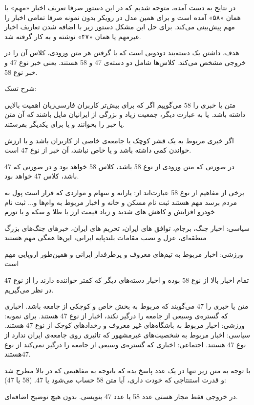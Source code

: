 در نتایج به دست آمده، متوجه شدیم که در این دستور صرفا تعریف اخبار «مهم» یا همان «۵۸» آمده است و برای همین مدل در رویکر بدون نمونه صرفا تمامی اخبار را مهم پیش‌بینی می‌کند. برای حل این مشکل دستور زیر با اضافه شدن تعاریف اخبار غیرمهم یا همان «۴۷» نوشته و به کار گرفته شد.

\vspace{5pt}
\begin{scriptsize}
\begin{itshape}
    هدف، داشتن یک دسته‌بند دودویی است که با گرفتن هر متن ورودی، کلاس آن را در خروجی مشخص می‌کند. کلاس‌ها شامل دو دسته‌ی 47 و 58 هستند. یعنی خبر نوع 47 و خبر نوع 58.

    شرح تسک:
    
    متن یا خبری را 58 می‌گوییم اگر که برای بیش‌تر کاربران فارسی‌زبان اهمیت بالایی داشته باشد. یا به عبارت دیگر، جمعیت زیاد و بزرگی از ایرانیان مایل باشند که آن متن یا خبر را بخوانند و یا برای یکدیگر بفرستند.
    
     اگر خبری مربوط به یک قشر کوچک یا جامعه‌ی خاصی از کاربران باشد و یا ارزش خواندن کمی داشته باشد و یا خاص نباشد، آن خبر از نوع 47 است.
    
    در صورتی که متن ورودی از نوع 58 باشد، کلاس 58 خواهد بود و در صورتی که 47 باشد، کلاس 47 خواهد بود.
    
    برخی از مفاهیم از نوع 58 عبارت‌اند از:
    یارانه و سهام و مواردی که قرار است پول به مردم برسد مهم هستند
    ثبت نام مسکن و خانه و اخبار مربوط به وام‌ها و...
    ثبت نام خودرو
    افزایش و کاهش های شدید و زیاد قیمت ارز یا طلا و سکه و یا تورم
    
    سیاسی:
    اخبار جنگ، برجام، توافق های ایران،
    تحریم های ایران،
    خبرهای جنگ‌های بزرگ منطقه‌ای،
    عزل و نصب مقامات بلندپایه ایرانی،
    این‌ها همگی مهم هستند
    
    ورزشی:
    اخبار مربوط به تیم‌های معروف و پرطرفدار ایرانی و همین‌طور اروپایی مهم است
    
    تمام اخبار بالا از نوع 58 بوده و اخبار دسته‌های دیگر که کمتر خواننده دارند را از نوع 47 در نظر می‌گیریم.
    
    متن یا خبری را 47 می‌گویند که مربوط به بخش خاص و کوچکی از جامعه باشد. اخباری که گستره‌ی وسیعی از جامعه را درگیر نکند، اخبار از نوع 47 هستند. برای نمونه:
    ورزشی: اخبار مربوط به باشگاه‌های غیر معروف و رخدادهای کوچک از نوع 47 هستند.
    سیاسی: اخبار مربوط به شخصیت‌های غیرمشهور که تاثیری روی جامعه‌ی ایران ندارد از نوع 47 هستند.
    اجتماعی: اخباری که گستره‌ی وسیعی از جامعه را درگیر نمی‌کند از نوع 47هستند.
    
    با توجه به متن زیر تنها در یک عدد پاسخ بده که باتوجه به مفاهیمی که در بالا مطرح شد و قدرت استنتاجی که خودت داری، آیا متن 58 حساب می‌شود یا 47. (58 یا 47):
    
    در خروجی فقط مجاز هستی عدد 58 یا عدد 47 بنویسی. بدون هیچ توضیح اضافه‌ای.
\end{itshape}
\end{scriptsize}
\vspace{5pt}


